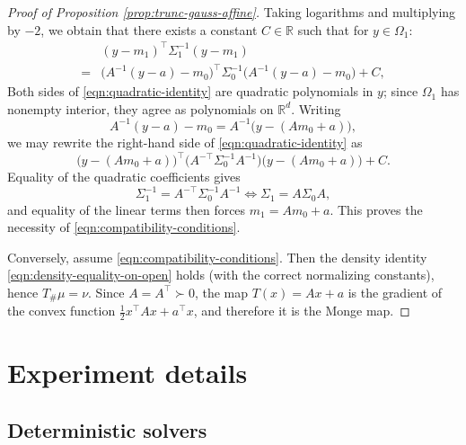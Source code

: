 \documentclass{article}
\theoremstyle{plain}
\theoremstyle{definition}
\theoremstyle{remark}
\numberwithin{equation}{section}
\newcommand{\R}{\mathbb{R}}
\begin{document}
\begin{proof}[Proof of Proposition \ref{prop:trunc-gauss-affine}]
Taking logarithms and multiplying by $-2$, we obtain that there exists a constant $C\in\R$ such that for $y\in\Omega_1$:
\begin{equation}\label{eqn:quadratic-identity}
\begin{aligned}
&(y-m_1)^\top\Sigma_1^{-1}(y-m_1)\\
=&\big(A^{-1}(y-a)-m_0\big)^\top\Sigma_0^{-1}\big(A^{-1}(y-a)-m_0\big)+C,
\end{aligned}
\end{equation}
Both sides of \eqref{eqn:quadratic-identity} are quadratic polynomials in $y$; since $\Omega_1$ has nonempty interior, they agree as polynomials on $\R^d$. 
Writing
$$
A^{-1}(y-a)-m_0=A^{-1}\big(y-(Am_0+a)\big),
$$
we may rewrite the right-hand side of \eqref{eqn:quadratic-identity} as
$$
\big(y-(Am_0+a)\big)^\top\big(A^{-\top}\Sigma_0^{-1}A^{-1}\big)\big(y-(Am_0+a)\big)+C.
$$
Equality of the quadratic coefficients gives
$$
\Sigma_1^{-1}=A^{-\top}\Sigma_0^{-1}A^{-1}\Longleftrightarrow\Sigma_1=A\Sigma_0A,
$$
and equality of the linear terms then forces $m_1=Am_0+a$. 
This proves the necessity of \eqref{eqn:compatibility-conditions}.

Conversely, assume \eqref{eqn:compatibility-conditions}. 
Then the density identity \eqref{eqn:density-equality-on-open} holds (with the correct normalizing constants), hence $T_\#\mu=\nu$.
Since $A=A^\top\succ0$, the map $T(x)=Ax+a$ is the gradient of the convex function $\frac12 x^\top Ax+a^\top x$, and therefore it is the Monge map.
\end{proof}
\section{Experiment details}
\subsection{Deterministic solvers}\label{sec:solvers}
\end{document}
